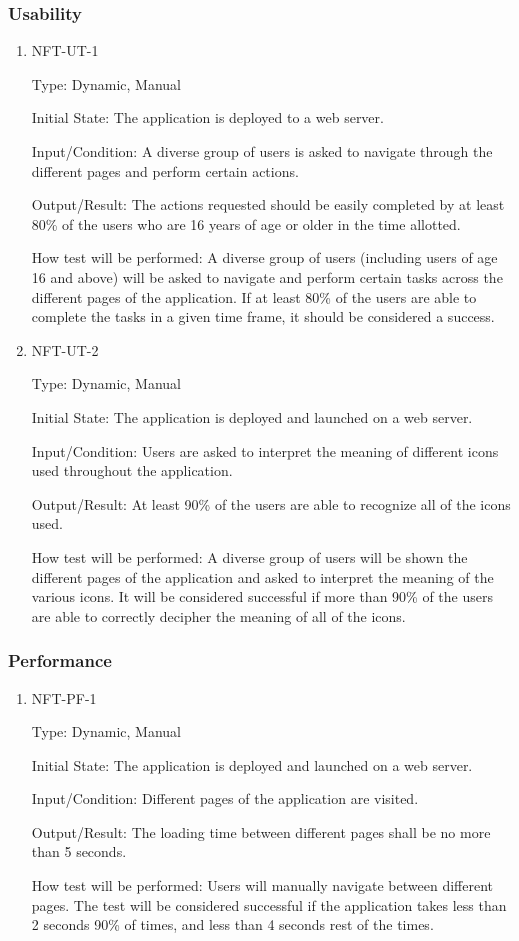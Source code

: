 \documentclass[12pt, titlepage]{article}
\begin{document}
\subsubsection{Usability}
\begin{enumerate}
\item{NFT-UT-1}

Type: Dynamic, Manual
					
Initial State: The application is deployed to a web server.
					
Input/Condition: A diverse group of users is asked to navigate through the different pages and perform certain actions.
					
Output/Result: The actions requested should be easily completed by at least 80\% of the users who are 16 years of age or older in the time allotted.
					
How test will be performed: A diverse group of users (including users of age 16 and above) will be asked to navigate and perform certain tasks across the different pages of the application. If at least 80\% of the users are able to complete the tasks in a given time frame, it should be considered a success.

\item{NFT-UT-2}

Type: Dynamic, Manual
					
Initial State: The application is deployed and launched on a web server.
					
Input/Condition: Users are asked to interpret the meaning of different icons used throughout the application.
					
Output/Result: At least 90\% of the users are able to recognize all of the icons used. 
					
How test will be performed: A diverse group of users will be shown the different pages of the application and asked to interpret the meaning of the various icons. It will be considered successful if more than 90\% of the users are able to correctly decipher the meaning of all of the icons.
\end{enumerate}

\subsubsection{Performance}
\begin{enumerate}

\item{NFT-PF-1}

Type: Dynamic, Manual
					
Initial State: The application is deployed and launched on a web server.
					
Input/Condition: Different pages of the application are visited.
					
Output/Result: The loading time between different pages shall be no more than 5 seconds.
					
How test will be performed: Users will manually navigate between different pages. The test will be considered successful if the application takes less than 2 seconds 90\% of times, and less than 4 seconds rest of the times.
\end{enumerate}
\end{document}
